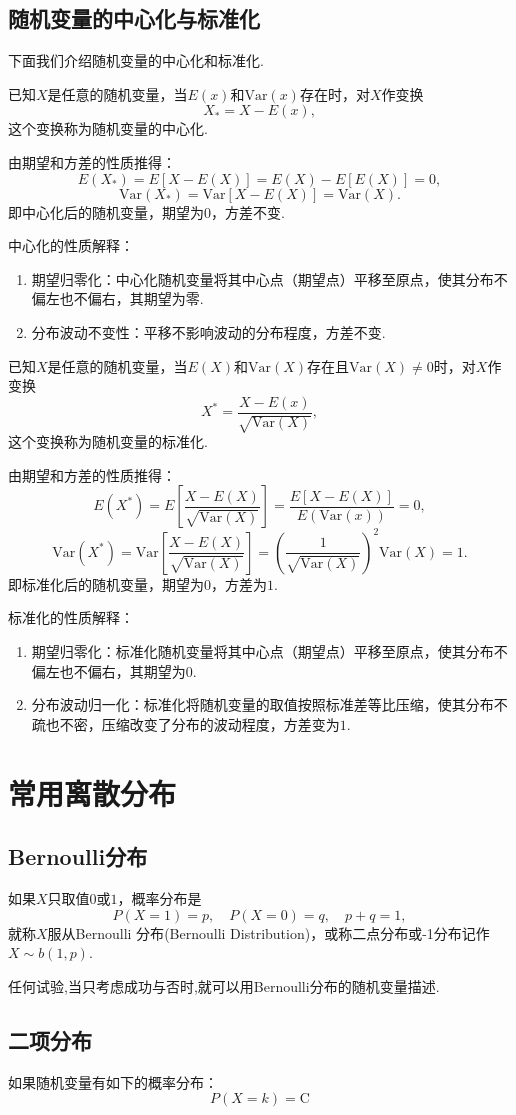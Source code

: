 \documentclass[lang=cn,10pt]{elegantbook}
\begin{document}
\subsection{随机变量的中心化与标准化}
下面我们介绍随机变量的中心化和标准化.
\begin{definition}[随机变量的中心化]
	已知$X$是任意的随机变量，当$E(x)$和$\mathrm{Var}(x)$存在时，对$X$作变换
	$$X_{*}=X-E(x),$$
	这个变换称为{\heiti 随机变量的中心化}.
\end{definition}
由期望和方差的性质推得：
$$E(X_{*})=E\left[X-E(X)\right]=E(X)-E\left[E(X)\right]=0,$$
$$\mathrm{Var}(X_{*})=\mathrm{Var}\left[X-E(X)\right]=\mathrm{Var}(X).$$
即中心化后的随机变量，期望为$0$，方差不变.

中心化的性质解释：
\begin{enumerate}[(1)]
	\item 期望归零化：中心化随机变量将其中心点（期望点）平移至原点，使其分布不偏左也不偏右，其期望为零.
	\item 分布波动不变性：平移不影响波动的分布程度，方差不变.
\end{enumerate}
\begin{definition}[随机变量的标准化]
	已知$X$是任意的随机变量，当$E(X)$和$\mathrm{Var}(X)$存在且$\mathrm{Var}(X)\neq 0$时，对$X$作变换
	$$X^{*}=\frac{X-E(x)}{\sqrt{\mathrm{Var}(X)}},$$
	这个变换称为随机变量的标准化.
\end{definition}
由期望和方差的性质推得：
$$E(X^{*})=E\left[\frac{X-E(X)}{\sqrt{\mathrm{Var}(X)}}\right]=\frac{E\left[X-E(X)\right]}{E\left(\mathrm{Var}(x)\right)}=0,$$
$$\mathrm{Var}(X^{*})=\mathrm{Var}\left[\frac{X-E(X)}{\sqrt{\mathrm{Var}(X)}}\right]=\left(\frac{1}{\sqrt{\mathrm{Var}(X)}}\right)^2\mathrm{Var}(X)=1.$$
即标准化后的随机变量，期望为$0$，方差为$1$.

标准化的性质解释：
\begin{enumerate}[(1)]
	\item 期望归零化：标准化随机变量将其中心点（期望点）平移至原点，使其分布不偏左也不偏右，其期望为$0$.
	\item 分布波动归一化：标准化将随机变量的取值按照标准差等比压缩，使其分布不疏也不密，压缩改变了分布的波动程度，方差变为$1$.
\end{enumerate}
\section{常用离散分布}
\subsection{Bernoulli分布}
\begin{definition}[Bernoulli分布]
	如果$X$只取值$0$或$1$，概率分布是
	$$P(X=1)=p,\quad P(X=0)=q,\quad p+q=1,$$
	就称$X$服从{\heiti Bernoulli 分布}(Bernoulli Distribution)，或称{\heiti 二点分布}或{-1分布}记作$X\sim b(1,p)$.
\end{definition}
任何试验,当只考虑成功与否时,就可以用Bernoulli分布的随机变量描述.
\subsection{二项分布}
\begin{definition}[二项分布]
	如果随机变量有如下的概率分布：
	$$P(X=k)=\mathrm{C}$$
\end{definition}
\end{document}
